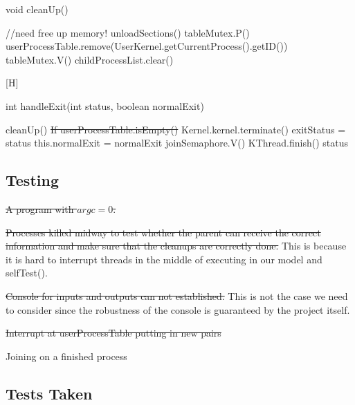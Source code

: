 \documentclass{article}
\begin{document}
\begin{spacing}{1.1}
\begin{algorithm}
\label{alg:cleanUp}
\caption{void \textsf{cleanUp}()}
    \colorbox{myyellow}{//need free up memory!}\;
    unloadSections()\;
    \colorbox{myyellow}{tableMutex.P()}\;
    userProcessTable.remove(UserKernel.getCurrentProcess().getID())\;
    \colorbox{myyellow}{tableMutex.V()}\;
    childProcessList.clear()\;
\end{algorithm}

\begin{algorithm}
  \label{alg:handleExit}[H]
  \caption{int \textsf{handleExit}(int status, boolean normalExit)}
  \textsf{cleanUp}()\;
  {\color{red}\sout{If userProcessTable.isEmpty()} \;}
   {
    Kernel.kernel.terminate()\;
  }
  exitStatus = status\;
  this.normalExit = normalExit\;
  joinSemaphore.V()\;
  \colorbox{myyellow}{KThread.finish()}\;
  \Return status\;
\end{algorithm}
\subsection{Testing}
\begin{asparaitem}
  \item {\color{red}\sout{A program with $argc=0$.}}
  \item {\color{red}\sout{Processes killed midway to test whether the parent can receive the correct information and make sure that the cleanups are correctly done.}} This is because it is hard to interrupt threads in the middle of      executing in our model and \textsf{selfTest}().
  \item {\color{red} \sout{Console for inputs and outputs can not established.}} This is not the case we need to consider since the robustness of the console is guaranteed by the project itself.

  \item {\color{red}\sout{Interrupt at userProcessTable putting in new pairs}}
  \item Joining on a finished process
\end{asparaitem}

\subsection{Tests Taken}

\end{spacing}
\end{document}
